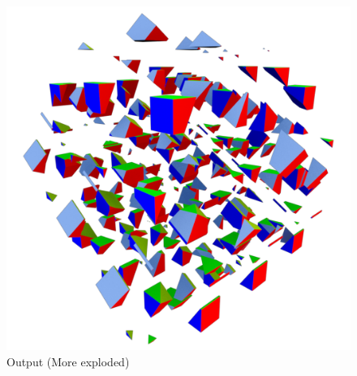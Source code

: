\begin{figure}[h]
    \includegraphics[width=\textwidth]{./img/test-2.pdf}%
    \caption{Output (More exploded)}
\end{figure}